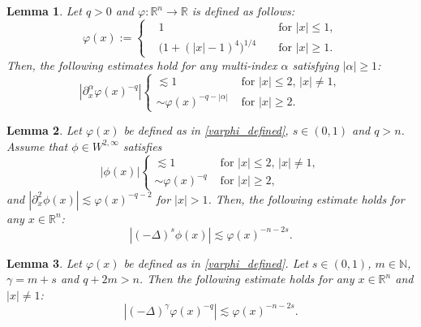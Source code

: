 \documentclass[10pt,a4paper]{amsart}
\newtheorem{lemma}{Lemma}
\begin{document}
\begin{lemma}\label{lem_Laplace_integer}
Let $q>0$ and $\varphi:\mathbb{R}^n\to \mathbb{R}$ is defined as follows:
\begin{equation}\label{varphi_defined}
\varphi(x):=\left\{
\begin{aligned}
&1&&\text{ for }|x|\leq 1,\\
&\big(1+(|x|-1)^{4}\big)^{1/4}&&\text{ for }|x|\geq 1.
\end{aligned}
\right.
\end{equation}
Then, the following estimates hold for any multi-index $\alpha$ satisfying $|\alpha|\geq 1$:
\[
\left|\partial^\alpha_x\varphi(x)^{-q}\right|
\begin{cases}
    \lesssim 1 &\text{ for }|x|\leq 2,\,|x|\neq 1,\\
    \sim \varphi(x)^{-q-|\alpha|} &\text{ for }|x|\geq 2.
\end{cases}
\]
\end{lemma}

\begin{lemma}\label{lem_Laplace_(0,1)}
Let $\varphi(x)$ be defined as in \eqref{varphi_defined}, $s \in (0,1)$ and $q>n$. Assume that $\phi\in W^{2,\infty}$ satisfies 
\[
|\phi(x)|
\begin{cases}
    \lesssim 1 &\text{ for }|x|\leq 2,\,|x|\neq 1,\\
    \sim \varphi(x)^{-q} &\text{ for }|x|\geq 2,
\end{cases}
\]
and $\left|\partial^2_x\phi(x)\right|\lesssim \varphi(x)^{-q-2}$ for $|x|>1$. Then, the following estimate holds for any $x\in \mathbb{R}^n$:
\begin{equation}\label{10}
\left|(-\Delta)^s\phi(x)\right|\lesssim \varphi(x)^{-n-2s}.
\end{equation}
\end{lemma}

\begin{lemma}\label{lem_Laplace_fractional}
    Let $\varphi(x)$ be defined as in \eqref{varphi_defined}. Let $s\in (0,1)$, $m\in \mathbb{N}$, $\gamma=m+s$ and $q+2m>n$. Then the following estimate holds for any $x\in \mathbb{R}^n$ and $|x|\neq 1$:
    \[
    |(-\Delta)^{\gamma}\varphi(x)^{-q}|\lesssim \varphi(x)^{-n-2s}.
    \]
\end{lemma}
\end{document}

